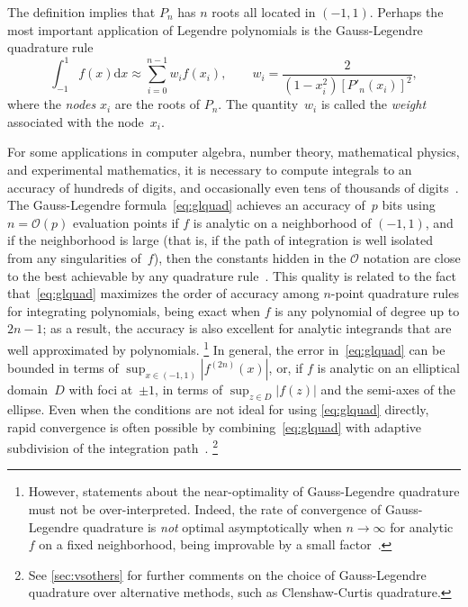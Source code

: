 \documentclass[nohypdvips,review]{siamart0216}
\newcommand{\dx}{\mathrm d x}
\newcommand{\OO}{\mathcal{O}}
\begin{document}
The definition implies that $P_n$ has $n$ roots all located in $(-1,1)$.
Perhaps the most important application of Legendre polynomials
is the Gauss-Legendre quadrature rule
\begin{equation}
\label{eq:glquad}
\int_{-1}^{1} f(x) \dx \approx \sum_{i=0}^{n-1} w_i f(x_i), \qquad
w_i = \frac{2}{(1-x_i^2) [P'_n(x_i)]^2},
\end{equation}
where the \emph{nodes} $x_i$ are the roots of $P_n$.
The quantity~$w_i$ is called the \emph{weight} associated
with the node~$x_i$.

For some applications in computer algebra, number theory,
mathematical physics, and experimental mathematics,
it is necessary to compute integrals to an accuracy of
hundreds of digits, and occasionally even tens of
thousands of
digits~\cite{bailey2011high,BaileyBorweinCrandall2006,Broadhurst2016,Molin2010a}.
The Gauss-Legendre formula~\cref{eq:glquad} achieves an accuracy of~$p$ bits using
$n = \OO(p)$ evaluation points if $f$ is analytic on a neighborhood
of $(-1,1)$, and if the neighborhood
is large (that is, if the path of integration is well isolated
from any singularities of~$f$), then
the constants hidden in the $\OO$
notation are close to the best achievable
by any quadrature rule~\cite{kowalski1985gauss}.
This quality is related to the fact that~\cref{eq:glquad}
maximizes the order of accuracy among $n$-point quadrature rules for integrating polynomials,
being exact when $f$ is any polynomial of degree up to $2n-1$;
as a result, the accuracy is also excellent for analytic integrands
that are well approximated by polynomials.%
\footnote{However, statements about the near-optimality of Gauss-Legendre
quadrature must not be over-interpreted.
Indeed, the rate of convergence of Gauss-Legendre quadrature is \emph{not} optimal asymptotically
when $n \to \infty$ for analytic $f$
on a fixed neighborhood, being improvable by a small factor~\cite{Trefethen2011}.}
In general, the error in~\cref{eq:glquad} can be bounded in terms of
$\sup_{x \in (-1,1)} |f^{(2n)}(x)|$, or, if $f$ is analytic on an
elliptical domain~$D$ with foci at~$\pm 1$, in terms of
$\sup_{z \in D} |f(z)|$ and the semi-axes of the ellipse.
Even when the conditions are not ideal for using \cref{eq:glquad} directly,
rapid convergence is often possible
by combining~\cref{eq:glquad}
with adaptive subdivision of the integration path~\cite{petras2002self}.%
\footnote{See \cref{sec:vsothers} for further comments on the choice of
Gauss-Legendre quadrature over alternative methods, such as
Clenshaw-Curtis quadrature.}
\end{document}
